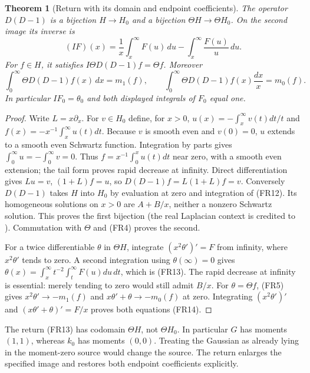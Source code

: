 \documentclass[11pt]{article}
\newtheorem{theorem}{Theorem}
\begin{document}
\begin{theorem}[Return with its domain and endpoint coefficients]
The operator $D(D-1)$ is a bijection $H\to H_0$ and a bijection $\Theta H\to\Theta H_0$. On the second image its inverse is
\begin{equation}
 (IF)(x)=\frac1x\int_x^\infty F(u)\,du-\int_x^\infty\frac{F(u)}u\,du.
 \tag{FR13}
\end{equation}
For $f\in H$, it satisfies $I\Theta D(D-1)f=\Theta f$. Moreover
\begin{equation}
 \int_0^\infty\Theta D(D-1)f(x)\,dx=m_1(f),\qquad
 \int_0^\infty\Theta D(D-1)f(x)\frac{dx}{x}=m_0(f).
 \tag{FR14}
\end{equation}
In particular $IF_0=\theta_0$ and both displayed integrals of $F_0$ equal one.
\end{theorem}
\begin{proof}
Write $L=x\partial_x$. For $v\in H_0$ define, for $x>0$,
$u(x)=-\int_x^\infty v(t)dt/t$ and $f(x)=-x^{-1}\int_x^\infty u(t)dt$.
Because $v$ is smooth even and $v(0)=0$, $u$ extends to a smooth even Schwartz function. Integration by parts gives $\int_0^\infty u=-\int_0^\infty v=0$. Thus $f=x^{-1}\int_0^xu(t)dt$ near zero, with a smooth even extension; the tail form proves rapid decrease at infinity. Direct differentiation gives $Lu=v$, $(1+L)f=u$, so $D(D-1)f=L(1+L)f=v$. Conversely $D(D-1)$ takes $H$ into $H_0$ by evaluation at zero and integration of (FR12). Its homogeneous solutions on $x>0$ are $A+B/x$, neither a nonzero Schwartz solution. This proves the first bijection (the real Laplacian context is credited to \cite{CC}). Commutation with $\Theta$ and (FR4) proves the second.

For a twice differentiable $\theta$ in $\Theta H$, integrate $(x^2\theta')'=F$ from infinity, where $x^2\theta'$ tends to zero. A second integration using $\theta(\infty)=0$ gives
$\theta(x)=\int_x^\infty t^{-2}\int_t^\infty F(u)du\,dt$, which is (FR13). The rapid decrease at infinity is essential: merely tending to zero would still admit $B/x$. For $\theta=\Theta f$, (FR5) gives $x^2\theta'\to-m_1(f)$ and $x\theta'+\theta\to-m_0(f)$ at zero. Integrating $(x^2\theta')'$ and $(x\theta'+\theta)'=F/x$ proves both equations (FR14).
\end{proof}

The return (FR13) has codomain $\Theta H$, not $\Theta H_0$. In particular $G$ has moments $(1,1)$, whereas $k_0$ has moments $(0,0)$. Treating the Gaussian as already lying in the moment-zero source would change the source. The return enlarges the specified image and restores both endpoint coefficients explicitly.
\end{document}
